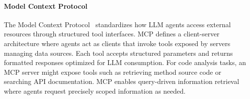 \paragraph{Model Context Protocol}
The Model Context Protocol~\cite{mcp} standardizes how LLM agents access external resources through structured tool interfaces. MCP defines a client-server architecture where agents act as clients that invoke tools exposed by servers managing data sources. Each tool accepts structured parameters and returns formatted responses optimized for LLM consumption. For code analysis tasks, an MCP server might expose tools such as retrieving method source code or searching API documentation. MCP enables query-driven information retrieval where agents request precisely scoped information as needed. 

